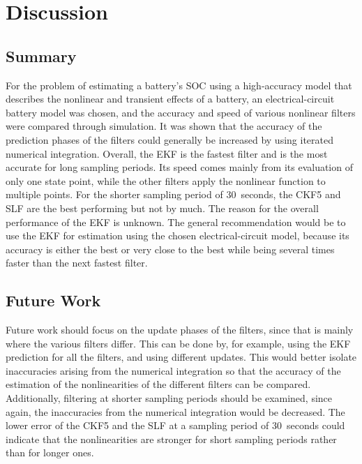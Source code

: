 \documentclass[../zhang_thesis.tex]{subfiles}
\begin{document}
\chapter{Discussion}


\section{Summary}

For the problem of estimating a battery's SOC using a high-accuracy model that describes the nonlinear and transient effects of a battery, an electrical-circuit battery model was chosen, and the accuracy and speed of various nonlinear filters were compared through simulation. It was shown that the accuracy of the prediction phases of the filters could generally be increased by using iterated numerical integration. Overall, the EKF is the fastest filter and is the most accurate for long sampling periods. Its speed comes mainly from its evaluation of only one state point, while the other filters apply the nonlinear function to multiple points. For the shorter sampling period of 30~seconds, the CKF5 and SLF are the best performing but not by much. The reason for the overall performance of the EKF is unknown. The general recommendation would be to use the EKF for estimation using the chosen electrical-circuit model, because its accuracy is either the best or very close to the best while being several times faster than the next fastest filter.

\section{Future Work}

Future work should focus on the update phases of the filters, since that is mainly where the various filters differ. This can be done by, for example, using the EKF prediction for all the filters, and using different updates. This would better isolate inaccuracies arising from the numerical integration so that the accuracy of the estimation of the nonlinearities of the different filters can be compared. Additionally, filtering at shorter sampling periods should be examined, since again, the inaccuracies from the numerical integration would be decreased. The lower error of the CKF5 and the SLF at a sampling period of 30~seconds could indicate that the nonlinearities are stronger for short sampling periods rather than for longer ones.
\end{document}
